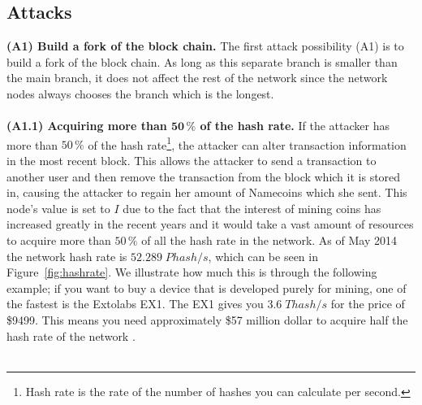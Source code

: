 \documentclass[frame, english]{idamasterthesis}
\begin{document}
\subsection{Attacks}
\textbf{(A1) Build a fork of the block chain.}
The first attack possibility (A1) is to build a fork of the block chain. As long as this separate branch is smaller than the main branch, it does not affect the rest of the network since the network nodes always chooses the branch which is the longest. \\\\
\noindent
\textbf{(A1.1) Acquiring more than $\boldsymbol{50 \, \%}$ of the hash rate.} If the attacker has more than $50 \, \%$ of the hash rate\footnote{Hash rate is the rate of the number of hashes you can calculate per second.}, the attacker can alter transaction information in the most recent block. This allows the attacker to send a transaction to another user and then remove the transaction from the block which it is stored in, causing the attacker to regain her amount of Namecoins which she sent. This node's value is set to $I$ due to the fact that the interest of mining coins has increased greatly in the recent years and it would take a vast amount of resources to acquire more than $50 \, \%$ of all the hash rate in the network. As of May 2014 the network hash rate is $52.289 \; Phash/s$, which can be seen in Figure~\ref{fig:hashrate}.  We illustrate how much this is through the following example; if you want to buy a device that is developed purely for mining, one of the fastest is the Extolabs EX1. The EX1 gives you $3.6 \; Thash/s$ for the price of \$9499. This means you need approximately \$57 million dollar to acquire half the hash rate of the network \cite{extolabs}. \\\\
\noindent
\end{document}
